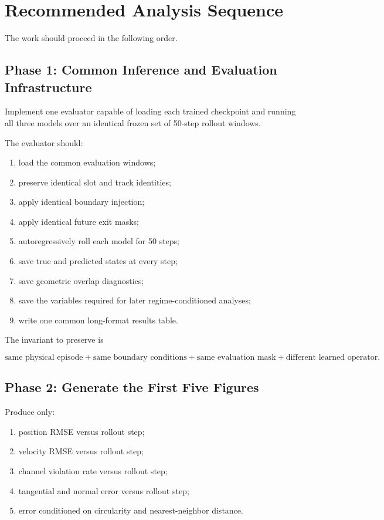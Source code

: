 \documentclass[11pt]{article}
\begin{document}
\section{Recommended Analysis Sequence}

The work should proceed in the following order.

\subsection*{Phase 1: Common Inference and Evaluation Infrastructure}

Implement one evaluator capable of loading each trained checkpoint and running all three models over an identical frozen set of 50-step rollout windows.

The evaluator should:

\begin{enumerate}
    \item load the common evaluation windows;
    \item preserve identical slot and track identities;
    \item apply identical boundary injection;
    \item apply identical future exit masks;
    \item autoregressively roll each model for 50 steps;
    \item save true and predicted states at every step;
    \item save geometric overlap diagnostics;
    \item save the variables required for later regime-conditioned analyses;
    \item write one common long-format results table.
\end{enumerate}

The invariant to preserve is

\begin{equation}
\text{same physical episode}
+
\text{same boundary conditions}
+
\text{same evaluation mask}
+
\text{different learned operator}.
\end{equation}

\subsection*{Phase 2: Generate the First Five Figures}

Produce only:

\begin{enumerate}
    \item position RMSE versus rollout step;
    \item velocity RMSE versus rollout step;
    \item channel violation rate versus rollout step;
    \item tangential and normal error versus rollout step;
    \item error conditioned on circularity and nearest-neighbor distance.
\end{enumerate}
\end{document}
